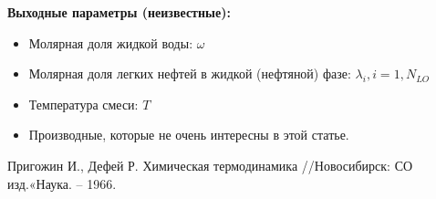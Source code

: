 \documentclass[12pt]{article}
\begin{document}
\textbf{Выходные параметры (неизвестные):}
\begin{itemize}
\item Молярная доля жидкой воды: $\omega$
\item Молярная доля легких нефтей в жидкой (нефтяной) фазе: $\lambda_i, i=1,N_{LO}$
\item Температура смеси: $T$
\item Производные, которые не очень интересны в этой статье.
\end{itemize}


\begin{thebibliography}{9}
     Пригожин И., Дефей Р. Химическая термодинамика //Новосибирск: СО изд.«Наука. – 1966.
\end{thebibliography}
\end{document}
